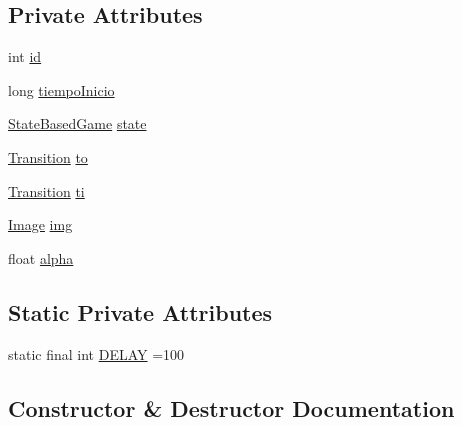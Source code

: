 \subsection*{Private Attributes}
\begin{DoxyCompactItemize}
\item 
int \mbox{\hyperlink{classstates_1_1_init_screen_a87ad48b02237b484fef3e4f22393eec9}{id}}
\item 
long \mbox{\hyperlink{classstates_1_1_init_screen_aefd25c80ad27b262ec41fa796aa5885a}{tiempo\+Inicio}}
\item 
\mbox{\hyperlink{classorg_1_1newdawn_1_1slick_1_1state_1_1_state_based_game}{State\+Based\+Game}} \mbox{\hyperlink{classstates_1_1_init_screen_a18c729614a5791801410d22943a7c36f}{state}}
\item 
\mbox{\hyperlink{interfaceorg_1_1newdawn_1_1slick_1_1state_1_1transition_1_1_transition}{Transition}} \mbox{\hyperlink{classstates_1_1_init_screen_a24baf6201c129619bc26e7e816174682}{to}}
\item 
\mbox{\hyperlink{interfaceorg_1_1newdawn_1_1slick_1_1state_1_1transition_1_1_transition}{Transition}} \mbox{\hyperlink{classstates_1_1_init_screen_ad5098ade4de0bc0bd8af0761c54605cb}{ti}}
\item 
\mbox{\hyperlink{classorg_1_1newdawn_1_1slick_1_1_image}{Image}} \mbox{\hyperlink{classstates_1_1_init_screen_a93fd19d9569e5b004ea177a3d8510777}{img}}
\item 
float \mbox{\hyperlink{classstates_1_1_init_screen_a00c24ac1441b1b92a8bdd02d539cb68e}{alpha}}
\end{DoxyCompactItemize}
\subsection*{Static Private Attributes}
\begin{DoxyCompactItemize}
\item 
static final int \mbox{\hyperlink{classstates_1_1_init_screen_a7b1930b85c1a0a9ddd325e84316b7cdb}{D\+E\+L\+AY}} =100
\end{DoxyCompactItemize}


\subsection{Constructor \& Destructor Documentation}
\mbox{\label{classstates_1_1_init_screen_a2dd28d80f8ad3aa9fe7b3199a9a8ad32}} 
